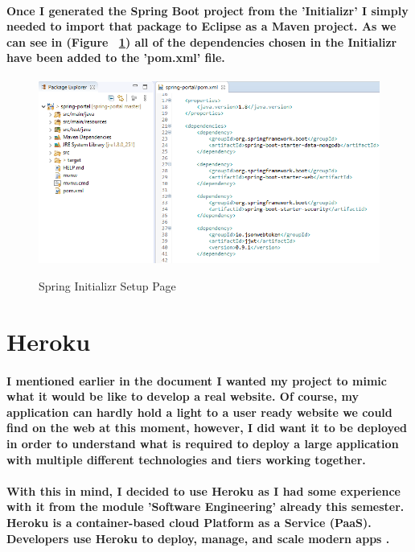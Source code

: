 \paragraph{Once I generated the Spring Boot project from the 'Initializr' I simply needed to import that package to Eclipse as a Maven project. As we can see in (Figure ~\ref{spring2_label}) all of the dependencies chosen in the Initializr have been added to the 'pom.xml' file.}
\begin{figure}[ht]
    \centering
    \includegraphics[scale=0.33]{Images/spring2.png} 
    \label{spring2_label}
    \caption{Spring Initializr Setup Page}
\end{figure}

\section{Heroku}
\paragraph{I mentioned earlier in the document I wanted my project to mimic what it would be like to develop a real website. Of course, my application can hardly hold a light to a user ready website we could find on the web at this moment, however, I did want it to be deployed in order to understand what is required to deploy a large application with multiple different technologies and tiers working together.}
\paragraph{With this in mind, I decided to use Heroku as I had some experience with it from the module 'Software Engineering' already this semester.
Heroku is a container-based cloud Platform as a Service (PaaS). Developers use Heroku to deploy, manage, and scale modern apps \cite{Heroku:about}.}
